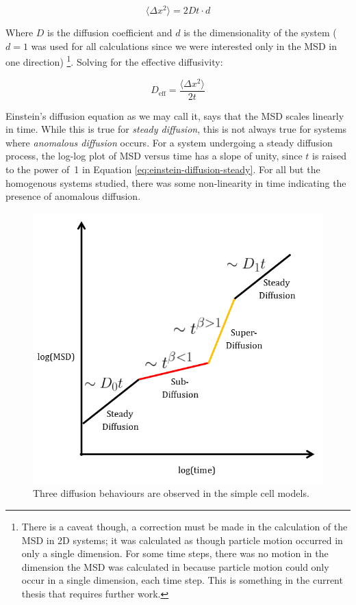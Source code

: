 	\begin{equation}
	\label{eq:einstein-diffusion-steady}
		\langle \Delta x^2 \rangle = 2Dt \cdot d
	\end{equation}
		
	Where $ D $ is the diffusion coefficient and $ d $ is the dimensionality of the system ($ d = 1 $ was used for all calculations since we were interested only in the MSD in one direction) \footnote{There is a caveat though, a correction must be made in the calculation of the MSD in 2D systems; it was calculated as though particle motion occurred in only a single dimension. For some time steps, there was no motion in the dimension the MSD was calculated in because particle motion could only occur in a single dimension, each time step. This is something in the current thesis that requires further work.}. Solving for the effective diffusivity:
	
	\begin{equation}
		D_\textrm{eff} = \dfrac{\langle \Delta x^2 \rangle}{2t}
	\end{equation}	
	
	\pagebreak
	Einstein's diffusion equation as we may call it, says that the MSD scales linearly in time. While this is true for \textsl{steady diffusion}, this is not always true for systems where \textsl{anomalous diffusion} occurs. For a system undergoing a steady diffusion process, the log-log plot of MSD versus time has a slope of unity, since $ t $ is raised to the power of~1 in Equation \ref{eq:einstein-diffusion-steady}. For all but the homogenous systems studied, there was some non-linearity in time indicating the presence of anomalous diffusion. 
		
	\begin{figure}[h]
		\centering
		\includegraphics[width=0.7\linewidth]{../images/diffusion-regime}
		\caption[Diffusion regimes observed]{Three diffusion behaviours are observed in the simple cell models.}
		\label{fig:diffusion-regime}
	\end{figure}

